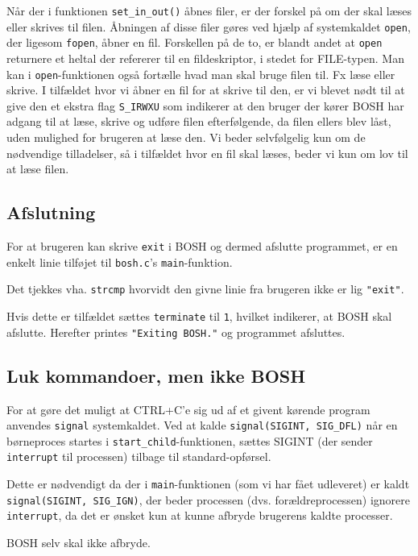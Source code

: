 Når der i funktionen \texttt{set\_in\_out()} åbnes filer, er der forskel på om der skal læses eller skrives til filen. Åbningen af disse filer gøres ved hjælp af systemkaldet \texttt{open}, der ligesom \texttt{fopen}, åbner en fil. Forskellen på de to, er blandt andet at \texttt{open} returnere et heltal der refererer til en fildeskriptor, i stedet for FILE-typen. Man kan i \texttt{open}-funktionen også fortælle hvad man skal bruge filen til. Fx læse eller skrive. I tilfældet hvor vi åbner en fil for at skrive til den, er vi blevet nødt til at give den et ekstra flag \texttt{S\_IRWXU} som indikerer at den bruger der kører BOSH har adgang til at læse, skrive og udføre filen efterfølgende, da filen ellers blev låst, uden mulighed for brugeren at læse den. Vi beder selvfølgelig kun om de nødvendige tilladelser, så i tilfældet hvor en fil skal læses, beder vi kun om lov til at læse filen.

\subsection{Afslutning}
For at brugeren kan skrive \texttt{exit} i BOSH og dermed afslutte programmet, er en enkelt linie tilføjet til \texttt{bosh.c}'s \texttt{main}-funktion. 

Det tjekkes vha. \texttt{strcmp} hvorvidt den givne linie fra brugeren ikke er lig \texttt{"exit"}.

Hvis dette er tilfældet sættes \texttt{terminate} til \texttt{1}, hvilket indikerer, at BOSH skal afslutte. Herefter printes \texttt{"Exiting BOSH."} og programmet afsluttes. 

\subsection{Luk kommandoer, men ikke BOSH}
For at gøre det muligt at CTRL+C'e sig ud af et givent kørende program anvendes \texttt{signal} systemkaldet. Ved at kalde \texttt{signal(SIGINT, SIG\_DFL)} når en børneproces startes i \texttt{start\_child}-funktionen, sættes SIGINT (der sender \texttt{interrupt} til processen) tilbage til standard-opførsel.

Dette er nødvendigt da der i \texttt{main}-funktionen (som vi har fået udleveret) er kaldt \texttt{signal(SIGINT, SIG\_IGN)}, der beder processen (dvs. forældreprocessen) ignorere \texttt{interrupt}, da det er ønsket kun at kunne afbryde brugerens kaldte processer. 

BOSH selv skal ikke afbryde.
